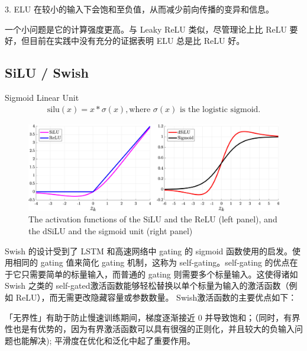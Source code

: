 \documentclass{article}
\begin{document}
3. ELU 在较小的输入下会饱和至负值，从而减少前向传播的变异和信息。

一个小问题是它的计算强度更高。与 Leaky ReLU 类似，尽管理论上比 ReLU 要好，但目前在实践中没有充分的证据表明 ELU 总是比 ReLU 好。


\subsection{SiLU / Swish}
Sigmoid Linear Unit
\begin{align}
\text{silu}(x) = x * \sigma(x), \text{where } \sigma(x) \text{ is the logistic sigmoid.}
\end{align}
\begin{figure}[htp]
\centering
\includegraphics[scale=1]{images/activation/SiLU.jpg}
\caption{The activation functions of the SiLU and the ReLU (left panel), and the dSiLU and the sigmoid unit (right panel)}
\label{SiLU}
\end{figure}

Swish 的设计受到了 LSTM 和高速网络中 gating 的 sigmoid 函数使用的启发。使用相同的 gating 值来简化 gating 机制，这称为 self-gating。self-gating 的优点在于它只需要简单的标量输入，而普通的 gating 则需要多个标量输入。这使得诸如 Swish 之类的 self-gated激活函数能够轻松替换以单个标量为输入的激活函数（例如 ReLU），而无需更改隐藏容量或参数数量。
Swish激活函数的主要优点如下：

「无界性」有助于防止慢速训练期间，梯度逐渐接近 0 并导致饱和；（同时，有界性也是有优势的，因为有界激活函数可以具有很强的正则化，并且较大的负输入问题也能解决);
平滑度在优化和泛化中起了重要作用。
\end{document}
